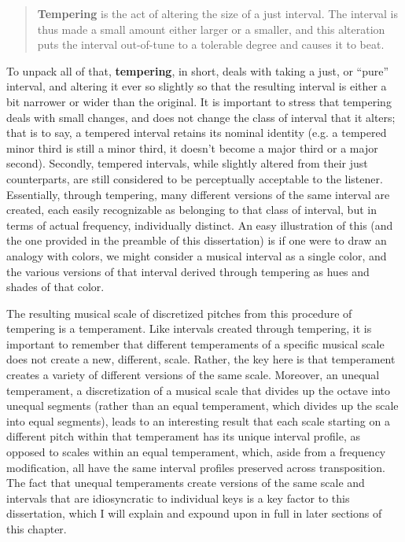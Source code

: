 \begin{quote}
\textbf{Tempering} is the act of altering the size of a just interval.
The interval is thus made a small amount either larger or a smaller, and
this alteration puts the interval out-of-tune to a tolerable degree and
causes it to beat.
\end{quote}

To unpack all of that, \textbf{tempering}, in short, deals with taking a
just, or ``pure'' interval, and altering it ever so slightly so that the
resulting interval is either a bit narrower or wider than the original.
It is important to stress that tempering deals with small changes, and
does not change the class of interval that it alters; that is to say, a
tempered interval retains its nominal identity (e.g. a tempered minor
third is still a minor third, it doesn't become a major third or a major
second). Secondly, tempered intervals, while slightly altered from their
just counterparts, are still considered to be perceptually acceptable to
the listener. Essentially, through tempering, many different versions of
the same interval are created, each easily recognizable as belonging to
that class of interval, but in terms of actual frequency, individually
distinct. An easy illustration of this (and the one provided in the
preamble of this dissertation) is if one were to draw an analogy with
colors, we might consider a musical interval as a single color, and the
various versions of that interval derived through tempering as hues and
shades of that color.

The resulting musical scale of discretized pitches from this procedure
of tempering is a temperament. Like intervals created through tempering,
it is important to remember that different temperaments of a specific
musical scale does not create a new, different, scale. Rather, the key
here is that temperament creates a variety of different versions of the
same scale. Moreover, an unequal temperament, a discretization of a
musical scale that divides up the octave into unequal segments (rather
than an equal temperament, which divides up the scale into equal
segments), leads to an interesting result that each scale starting on a
different pitch within that temperament has its unique interval profile,
as opposed to scales within an equal temperament, which, aside from a
frequency modification, all have the same interval profiles preserved
across transposition. The fact that unequal temperaments create versions
of the same scale and intervals that are idiosyncratic to individual
keys is a key factor to this dissertation, which I will explain and
expound upon in full in later sections of this chapter.

